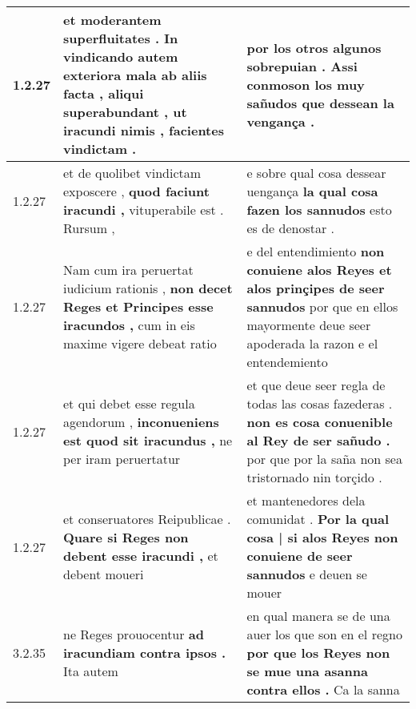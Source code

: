\begin{tabular}{|p{1cm}|p{6.5cm}|p{6.5cm}|}

\hline
1.2.27 & et moderantem superfluitates . In vindicando autem exteriora mala ab aliis facta , aliqui superabundant , \textbf{ ut iracundi nimis , } facientes vindictam . & por los otros algunos sobrepuian . \textbf{ Assi conmoson los muy sañudos } que dessean la vengança . \\\hline
1.2.27 & et de quolibet vindictam exposcere , \textbf{ quod faciunt iracundi , } vituperabile est . Rursum , & e sobre qual cosa dessear uengança \textbf{ la qual cosa fazen los sannudos } esto es de denostar . \\\hline
1.2.27 & Nam cum ira peruertat iudicium rationis , \textbf{ non decet Reges et Principes esse iracundos , } cum in eis maxime vigere debeat ratio & e del entendimiento \textbf{ non conuiene alos Reyes et alos prinçipes de seer sannudos } por que en ellos mayormente deue seer apoderada la razon e el entendemiento \\\hline
1.2.27 & et qui debet esse regula agendorum , \textbf{ inconueniens est quod sit iracundus , } ne per iram peruertatur & et que deue seer regla de todas las cosas fazederas . \textbf{ non es cosa conuenible al Rey de ser sañudo . } por que por la saña non sea tristornado nin torçido . \\\hline
1.2.27 & et conseruatores Reipublicae . \textbf{ Quare si Reges non debent esse iracundi , } et debent moueri & et mantenedores dela comunidat . \textbf{ Por la qual cosa | si alos Reyes non conuiene de seer sannudos } e deuen se mouer \\\hline
3.2.35 & ne Reges prouocentur \textbf{ ad iracundiam contra ipsos . } Ita autem & en qual manera se de una auer los que son en el regno \textbf{ por que los Reyes non se mue una asanna contra ellos . } Ca la sanna \\\hline

\end{tabular}
